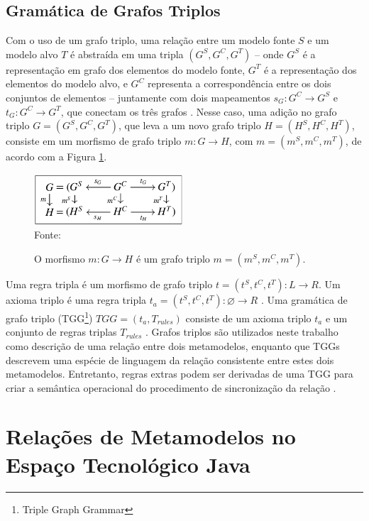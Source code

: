 \documentclass[cic,resumo-unibral]{iiufrgs}
\begin{document}
\begin{extendedsummary}
\subsection{Gramática de Grafos Triplos}
Com o uso de um grafo triplo, uma relação entre um modelo fonte $S$ e um modelo alvo $T$ é abstraída em uma tripla $(G^S,G^C,G^T)$ – onde $G^S$ é a representação em grafo dos elementos do modelo fonte, $G^T$ é a representação dos elementos do modelo alvo, e $G^C$ representa a correspondência entre os dois conjuntos de elementos – juntamente com dois mapeamentos $s_G: G^C \rightarrow G^S$ e $t_G: G^C \rightarrow G^T$, que conectam os três grafos \citep{hermann2011correctness}. Nesse caso, uma adição no grafo triplo $G = (G^S,G^C,G^T)$, que leva a um novo grafo triplo $H = (H^S,H^C,H^T)$, consiste em um morfismo de grafo triplo $m: G \rightarrow H$, com $m = (m^S,m^C,m^T)$, de acordo com a Figura \ref{fig:tg_morphism}.
\begin{figure}[h]
	\centering
	\caption{O morfismo $m: G \rightarrow H$ é um grafo triplo $m =  (m^S,m^C,m^T)$.}
	\includegraphics[width=15em]{tg_morphism}\\
	Fonte: \citep{hermann2011correctness}
	\label{fig:tg_morphism}
\end{figure}

Uma regra tripla é um morfismo de grafo triplo $t = (t^S,t^C,t^T) : L \rightarrow R$. Um axioma triplo é uma regra tripla $t_a = (t^S,t^C,t^T) : \varnothing \rightarrow R$ \cite{ehrig2007information}. Uma gramática de grafo triplo (TGG\footnote{Triple Graph Grammar}) $TGG = (t_a, T_{rules})$ consiste de um axioma triplo $t_a$ e um conjunto de regras triplas $T_{rules}$ \cite[p. 4]{giese2010toward}. Grafos triplos são utilizados neste trabalho como descrição de uma relação entre dois metamodelos, enquanto que TGGs descrevem uma espécie de linguagem da relação consistente entre estes dois metamodelos. Entretanto, regras extras podem ser derivadas de uma TGG para criar a semântica operacional do procedimento de sincronização da relação \cite{giese2010toward}.

\section{Relações de Metamodelos no Espaço Tecnológico Java}


\end{extendedsummary}
\end{document}
